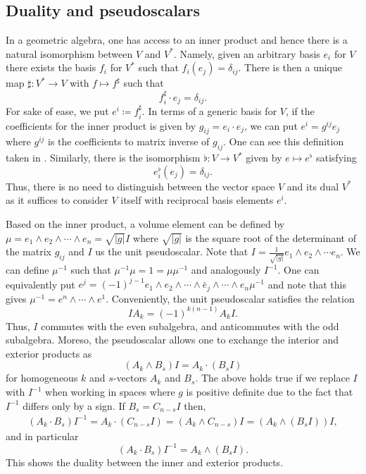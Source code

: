 \documentclass[12pt]{article}
\begin{document}
\subsection{Duality and pseudoscalars}
\label{subsection:duality_and_pseudoscalars}

In a geometric algebra, one has access to an inner product and hence there is a natural isomorphism between $V$ and $V^*$.  Namely, given an arbitrary basis $e_i$ for $V$ there exists the basis $f_i$ for $V^*$ such that $f_i(e_j)=\delta_{ij}$.  There is then a unique map $\sharp \colon V^* \to V$ with $f\mapsto f^\sharp$ such that
\[
f_i^\sharp \cdot e_j = \delta_{ij}.
\]
For sake of ease, we put $e^i \coloneqq f_i^\sharp$.  In terms of a generic basis for $V$, if the coefficients for the inner product is given by $g_{ij}=e_i\cdot e_j$, we can put $e^i = g^{ij}e_j$ where $g^{ij}$ is the coefficients to matrix inverse of $g_{ij}$.  One can see this definition taken in \cite{schindler_geometric_2020}. Similarly, there is the isomorphism $\flat \colon V \to V^*$ given by $e \mapsto e^\flat$ satisfying
\[
e_i^\flat (e_j)= \delta_{ij}.
\]
Thus, there is no need to distinguish between the vector space $V$ and its dual $V^*$ as it suffices to consider $V$ itself with reciprocal basis elements $e^i$.

Based on the inner product, a volume element can be defined by $\mu=e_1 \wedge e_2 \wedge \cdots \wedge e_n = \sqrt{|g|} I$ where $\sqrt{|g|}$ is the square root of the determinant of the matrix $g_{ij}$ and $I$ us the unit pseudoscalar. Note that $I=\frac{1}{\sqrt{|g|}} e_1 \wedge e_2 \wedge \cdots e_n$. We can define $\mu^{-1}$ such that $\mu^{-1}\mu = 1 = \mu \mu^{-1}$ and analogously $I^{-1}$.  One can equivalently put $e^j = (-1)^{j-1} e_1 \wedge e_2 \wedge \cdots \wedge \breve{e_j} \wedge \cdots \wedge e_n \mu^{-1}$ and note that this gives $\mu^{-1} = e^n \wedge \cdots \wedge e^1$.  Conveniently, the unit pseudoscalar satisfies the relation
\[
IA_k = (-1)^{k(n-1)} A_k I.
\]
Thus, $I$ commutes with the even subalgebra, and anticommutes with the odd subalgebra.  Moreso, the pseudoscalar allows one to exchange the interior and exterior products as
\begin{equation}
\label{eq:wedge_to_dot}
 (A_k \wedge B_s) I = A_k \cdot (B_s I)
\end{equation}
for homogeneous $k$ and $s$-vectors $A_k$ and $B_s$. The above holds true if we replace $I$ with $I^{-1}$ when working in spaces where $g$ is positive definite due to the fact that $I^{-1}$ differs only by a sign. If $B_s = C_{n-s}I$ then,
\begin{align*}
 (A_k \cdot B_s)I^{-1} = A_k \cdot (C_{n-s}I) = (A_k \wedge C_{n-s})I = (A_k \wedge (B_sI))I,
\end{align*}
and in particular
\begin{equation}
\label{eq:dot_to_wedge}
    (A_k \cdot B_s)I^{-1} = A_k \wedge (B_s I).
\end{equation}
This shows the duality between the inner and exterior products.
\end{document}
